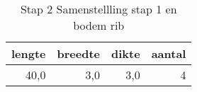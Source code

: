 \begin{table}[h!]
\centering
\caption{Stap 2 Samenstellling stap 1 en bodem rib}
\begin{tabular}{rrrr}
\toprule
 lengte &  breedte &  dikte &  aantal \\
\midrule
   40,0 &      3,0 &    3,0 &       4 \\
\bottomrule
\end{tabular}
\end{table}
